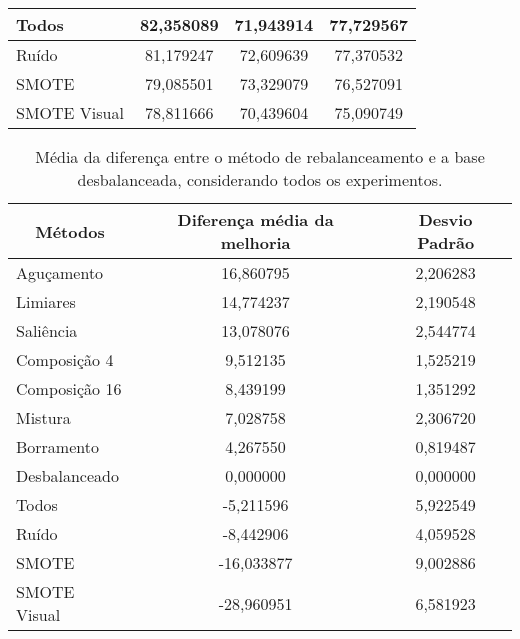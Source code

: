 \begin{table}[!htbp]
\begin{tabular}{|l|c|c|c|}
Todos                                  & 82,358089                         & 71,943914                     & 77,729567      \\ \hline
Ruído                                  & 81,179247                         & 72,609639                     & 77,370532      \\ \hline
SMOTE                                  & 79,085501                         & 73,329079                     & 76,527091      \\ \hline
SMOTE Visual                           & 78,811666                         & 70,439604                     & 75,090749      \\ \hline
\end{tabular}
\end{table}

\begin{table}[!htbp]
\centering
\caption{Média da diferença entre o método de rebalanceamento e a base desbalanceada, considerando todos os experimentos.}
\begin{tabular}{|l|c|c|}
\hline
\multicolumn{1}{|c|}{\textbf{Métodos}} & \textbf{Diferença média da melhoria} & \textbf{Desvio Padrão} \\ \hline
Aguçamento                             & 16,860795                            & 2,206283     \\ \hline
Limiares                               & 14,774237                            & 2,190548     \\ \hline
Saliência                              & 13,078076                            & 2,544774     \\ \hline
Composição 4                           & 9,512135                             & 1,525219     \\ \hline
Composição 16                          & 8,439199                             & 1,351292     \\ \hline
Mistura                                & 7,028758                             & 2,306720     \\ \hline
Borramento                             & 4,267550                             & 0,819487     \\ \hline
Desbalanceado                          & 0,000000                             & 0,000000     \\ \hline
Todos                                  & -5,211596                            & 5,922549     \\ \hline
Ruído                                  & -8,442906                            & 4,059528     \\ \hline
SMOTE                                  & -16,033877                           & 9,002886     \\ \hline
SMOTE Visual                           & -28,960951                           & 6,581923     \\ \hline
\end{tabular}
\end{table}

